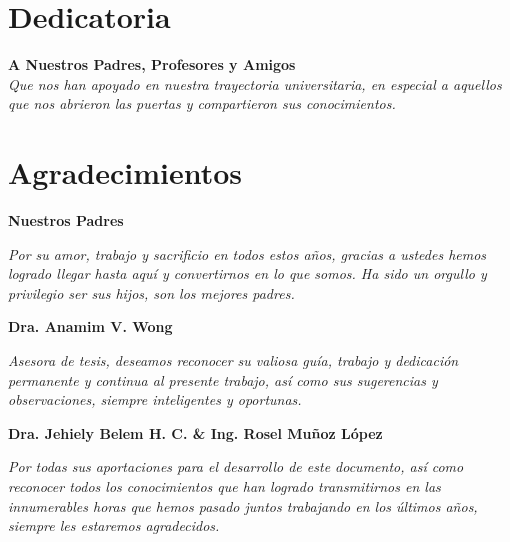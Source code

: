 
\chapter*{Dedicatoria}
\thispagestyle{empty}

	\begin{flushright}
	\vfill
	\textbf{A Nuestros Padres, Profesores y Amigos}\\
	\textit{Que nos han apoyado en nuestra trayectoria universitaria, en especial a aquellos\\ que nos abrieron las puertas y compartieron sus conocimientos.}
	\vfill
\end{flushright}

\chapter*{Agradecimientos}
\thispagestyle{empty}
\vfill
{\flushright \textbf{Nuestros Padres}\\}

\textit{Por su amor, trabajo y sacrificio en todos estos años, gracias a ustedes hemos logrado llegar hasta aquí y convertirnos en lo que somos. Ha sido un orgullo y privilegio ser sus hijos, son los mejores padres.}
\newline

{\flushright \textbf{Dra. Anamim V. Wong\\}}

\textit{Asesora de tesis, deseamos reconocer su valiosa guía, trabajo y dedicación permanente y continua al presente trabajo, así como sus sugerencias y observaciones, siempre inteligentes y oportunas.}
\newline

{\flushright \textbf{Dra. Jehiely Belem H. C.  \& Ing. Rosel Muñoz López}\\}

\textit{Por todas sus aportaciones para el desarrollo de este documento, así como reconocer todos los conocimientos que han logrado transmitirnos en las innumerables horas que hemos pasado juntos trabajando en los últimos años, siempre les estaremos agradecidos.}
\newline
\vfill






